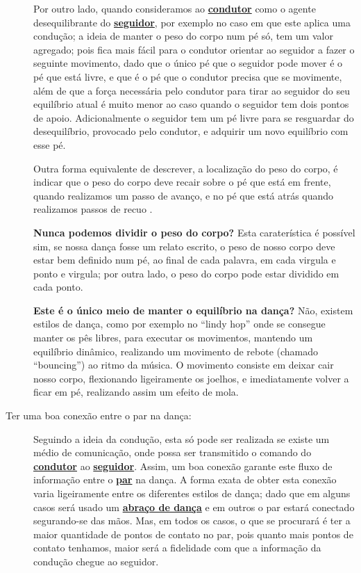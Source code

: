 \begin{description}
Por outro lado, quando consideramos ao 
\hyperref[def:Condutor]{\textbf{condutor}} como o agente desequilibrante do \hyperref[def:Seguidor]{\textbf{seguidor}}, 
por exemplo no caso em que este aplica uma condução;
a ideia de manter o peso do corpo num pé só, tem um valor agregado; 
pois fica mais fácil para o condutor orientar
ao seguidor a fazer o seguinte movimento, dado que o único pé que o seguidor pode mover é o pé
que está livre, e que é o pé que o condutor precisa que se movimente, 
além de que a força necessária pelo condutor para tirar ao seguidor do seu equilíbrio 
atual é muito menor ao caso quando o seguidor tem dois pontos de apoio.
Adicionalmente o seguidor tem um pé livre para se resguardar do desequilíbrio, provocado pelo 
condutor, e adquirir um novo equilíbrio com esse pé.

Outra forma equivalente de descrever, a localização do peso do corpo, 
é indicar que o peso do corpo deve recair sobre o pé que está em frente, 
quando realizamos um passo de avanço, 
e no pé que está atrás quando realizamos passos de recuo \cite[pp. 19]{freitas1959danca}.


\textbf{Nunca podemos dividir o peso do corpo?} Esta caraterística é possível sim,
se nossa dança fosse um relato escrito, o peso de nosso corpo deve estar bem definido num pé,
ao final de cada palavra, em cada virgula e ponto e virgula; por outra lado, 
o peso do corpo pode estar dividido em cada ponto.

\textbf{Este é o único meio de manter o equilíbrio na dança?}  Não, 
existem estilos de dança, como por exemplo no ``lindy hop'' onde se consegue manter os pês libres, 
para executar os movimentos, mantendo um equilíbrio dinâmico,
realizando um movimento de rebote (chamado ``bouncing'') ao ritmo da música.
O movimento consiste em deixar cair nosso corpo, flexionando ligeiramente  os joelhos, 
e imediatamente volver a ficar em pé, realizando assim um efeito de mola. 

\item[Ter uma boa conexão entre o par na dança:] Seguindo a ideia da condução, esta só pode
ser realizada se existe um médio de comunicação, onde possa ser transmitido
o comando do \hyperref[def:Condutor]{\textbf{condutor}} ao \hyperref[def:Seguidor]{\textbf{seguidor}}. 
Assim, um boa conexão garante este fluxo de informação entre o \hyperref[def:Par]{\textbf{par}} na dança. 
A forma exata de obter esta conexão varia ligeiramente entre os diferentes estilos de dança;
dado que em alguns casos será usado um \hyperref[def:abracodedanca]{\textbf{abraço de dança}} 
e em outros o par estará conectado segurando-se das mãos.
Mas, em todos os casos, 
o que se procurará é ter a maior quantidade de pontos de contato no par,
pois quanto mais pontos de contato tenhamos, 
maior será a fidelidade com que a informação da condução chegue ao seguidor.



\end{description}
